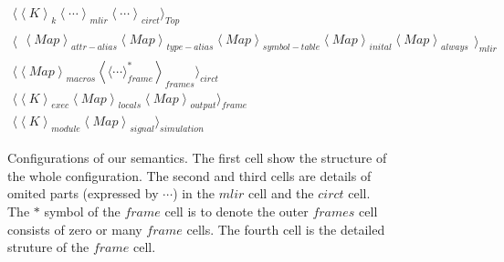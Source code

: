 \begin{figure}
\centering
\begin{gather*}
\Biggl\langle
    \left\langle K\right\rangle_{k}
    \left\langle \cdots \right\rangle_{mlir}
    \left\langle \cdots \right\rangle_{circt}
\Biggr\rangle_{Top}\\
\Biggl\langle
\begin{aligned}
    \left\langle Map \right\rangle_{attr-alias}
    \left\langle Map \right\rangle_{type-alias}
    \left\langle Map \right\rangle_{symbol-table}
    \left\langle Map \right\rangle_{inital}
    \left\langle Map \right\rangle_{always}
\end{aligned}
\Biggr\rangle_{mlir}\\
\Biggl\langle
    \left\langle Map\right\rangle_{macros}
    \left\langle \langle\cdots\rangle^*_{frame} \right\rangle_{frames}
\Biggr\rangle_{circt}\\
\Biggl\langle
    \left\langle K \right\rangle_{exec}
    \left\langle Map\right\rangle_{locals}
    \left\langle Map\right\rangle_{output}
\Biggr\rangle_{frame}\\
\Biggl\langle
    \left\langle K \right\rangle_{module}
    \left\langle Map\right\rangle_{signal}
\Biggr\rangle_{simulation}
\end{gather*}
\caption{Configurations of our semantics. The first cell show the structure of the whole configuration. The second and third cells are details of omited parts (expressed by $\cdots$) in the $mlir$ cell and the $circt$ cell. The $*$ symbol of the $frame$ cell is to denote the outer $frames$ cell consists of zero or many $frame$ cells. The fourth cell is the detailed struture of the $frame$ cell.}
\end{figure}

